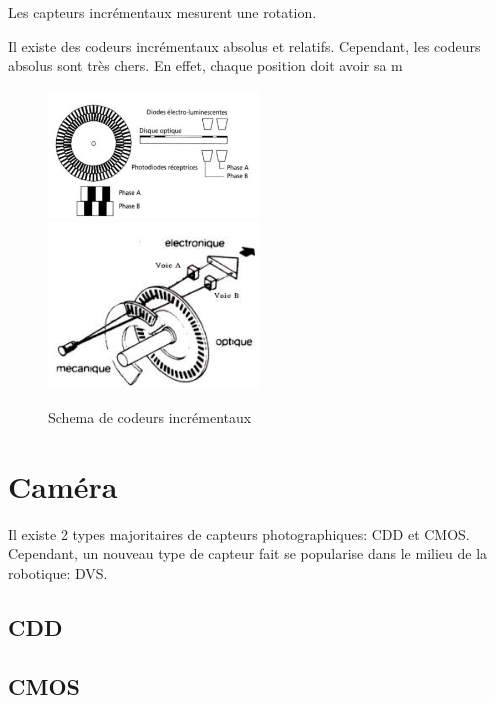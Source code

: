 \documentclass[a4paper, 11pt]{report}
\begin{document}
Les capteurs incrémentaux mesurent une rotation.

Il existe des codeurs incrémentaux absolus et relatifs. Cependant, les codeurs absolus sont très chers. En effet, chaque position doit avoir sa m

\begin{figure}[h]
\begin{centering}
\includegraphics[width=0.5\textwidth]{images/codeurIncremental.jpg}
\includegraphics[width=0.5\textwidth]{images/schemaCodeurIncremental.jpeg}
\caption{Schema de codeurs incrémentaux}
\par\end{centering}
\end{figure}

\section{Caméra}
Il existe 2 types majoritaires de capteurs photographiques: CDD et CMOS. Cependant, un  nouveau type de capteur fait se popularise dans le milieu de la robotique: DVS.

\subsection{CDD}

\subsection{CMOS}
\end{document}
